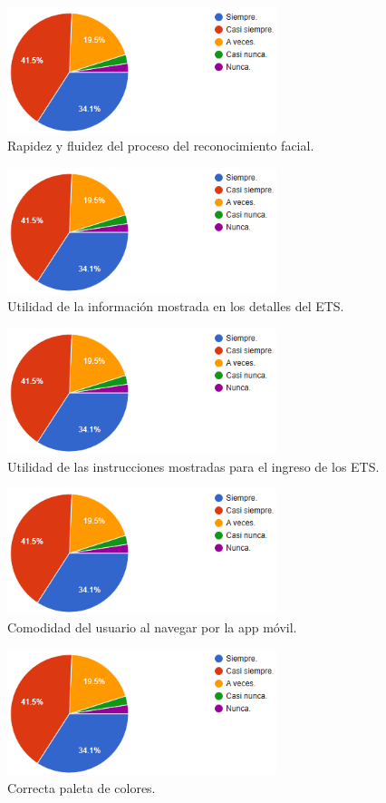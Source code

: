 \begin{figure}
	\centering
	\includegraphics[width=0.7\textwidth]{images/FRF.png}
	\caption{Rapidez y fluidez del proceso del reconocimiento facial.}
	\label{fig:FRRF}
\end{figure}
\begin{figure}
	\centering
	\includegraphics[width=0.7\textwidth]{images/FRF.png}
	\caption{Utilidad de la información mostrada en los detalles del ETS.}
	\label{fig:IIETS}
\end{figure}
\begin{figure}
	\centering
	\includegraphics[width=0.7\textwidth]{images/FRF.png}
	\caption{Utilidad de las instrucciones mostradas para el ingreso de los ETS.}
	\label{fig:USIETS}
\end{figure}
\begin{figure}
	\centering
	\includegraphics[width=0.7\textwidth]{images/FRF.png}
	\caption{Comodidad del usuario al navegar por la app móvil.}
	\label{fig:CNU}
\end{figure}
\begin{figure}
	\centering
	\includegraphics[width=0.7\textwidth]{images/FRF.png}
	\caption{Correcta paleta de colores.}
	\label{fig:UCA}
\end{figure}